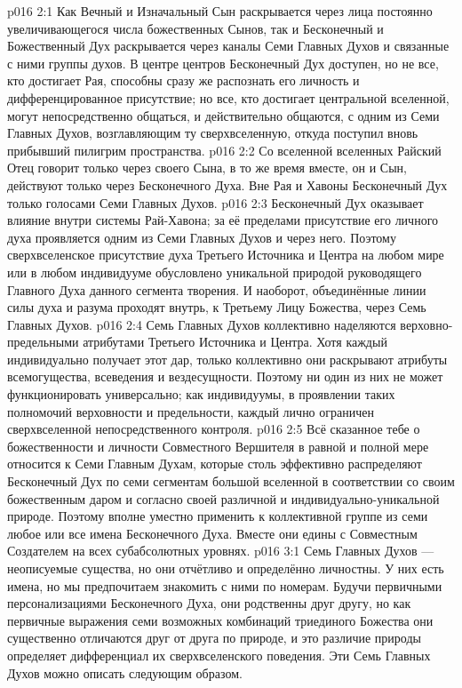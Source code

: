 \vs p016 2:1 Как Вечный и Изначальный Сын раскрывается через лица постоянно увеличивающегося числа божественных Сынов, так и Бесконечный и Божественный Дух раскрывается через каналы Семи Главных Духов и связанные с ними группы духов. В центре центров Бесконечный Дух доступен, но не все, кто достигает Рая, способны сразу же распознать его личность и дифференцированное присутствие; но все, кто достигает центральной вселенной, могут непосредственно общаться, и действительно общаются, с одним из Семи Главных Духов, возглавляющим ту сверхвселенную, откуда поступил вновь прибывший пилигрим пространства.
\vs p016 2:2 Со вселенной вселенных Райский Отец говорит только через своего Сына, в то же время вместе, он и Сын, действуют только через Бесконечного Духа. Вне Рая и Хавоны Бесконечный Дух  только голосами Семи Главных Духов.
\vs p016 2:3 \pc Бесконечный Дух оказывает влияние  внутри системы Рай\hyp{}Хавона; за её пределами присутствие его личного духа проявляется одним из Семи Главных Духов и через него. Поэтому сверхвселенское присутствие духа Третьего Источника и Центра на любом мире или в любом индивидууме обусловлено уникальной природой руководящего Главного Духа данного сегмента творения. И наоборот, объединённые линии силы духа и разума проходят внутрь, к Третьему Лицу Божества, через Семь Главных Духов.
\vs p016 2:4 \pc Семь Главных Духов коллективно наделяются верховно\hyp{}предельными атрибутами Третьего Источника и Центра. Хотя каждый индивидуально получает этот дар, только коллективно они раскрывают атрибуты всемогущества, всеведения и вездесущности. Поэтому ни один из них не может функционировать универсально; как индивидуумы, в проявлении таких полномочий верховности и предельности, каждый лично ограничен сверхвселенной непосредственного контроля.
\vs p016 2:5 Всё сказанное тебе о божественности и личности Совместного Вершителя в равной и полной мере относится к Семи Главным Духам, которые столь эффективно распределяют Бесконечный Дух по семи сегментам большой вселенной в соответствии со своим божественным даром и согласно своей различной и индивидуально\hyp{}уникальной природе. Поэтому вполне уместно применить к коллективной группе из семи любое или все имена Бесконечного Духа. Вместе они едины с Совместным Создателем на всех субабсолютных уровнях.
\vs p016 3:1 Семь Главных Духов --- неописуемые существа, но они отчётливо и определённо личностны. У них есть имена, но мы предпочитаем знакомить с ними по номерам. Будучи первичными персонализациями Бесконечного Духа, они родственны друг другу, но как первичные выражения семи возможных комбинаций триединого Божества они существенно отличаются друг от друга по природе, и это различие природы определяет дифференциал их сверхвселенского поведения. Эти Семь Главных Духов можно описать следующим образом.
